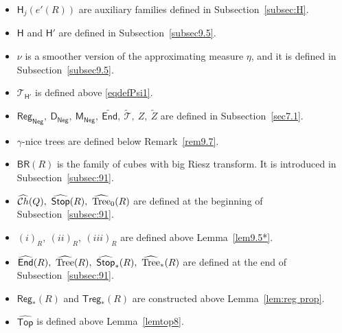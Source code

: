 \documentclass[11pt]{amsart}
\newcommand{\TT}{{\mathcal T}}
\newcommand{\Ch}{{\mathcal Ch}}
\newcommand{\vvv}{{\vspace{3mm}}}
\newcommand{\wt}[1]{{\widetilde{#1}}}
\newcommand{\wh}[1]{{\widehat{#1}}}
\newcommand{\ttt}{{\mathsf {Top}}}
\newcommand{\treg}{{\mathsf{Treg}}}
\newcommand{\tree}{{\rm Tree}}
\newcommand{\BR}{{\mathsf {BR}}}
\newcommand{\Stop}{{\mathsf{Stop}}}
\newcommand{\sD}{{\mathsf{D}}}
\newcommand{\sH}{{\mathsf{H}}}
\newcommand{\sM}{{\mathsf{M}}}
\newcommand{\Neg}{{\mathsf{Neg}}}
\newcommand{\End}{{\mathsf{End}}}
\newcommand{\Reg}{{\mathsf{Reg}}}
\theoremstyle{definition}
\theoremstyle{remark}
\numberwithin{equation}{section}
\begin{document}
\begin{itemize}
	\item $\sH_j(e'(R))$ are auxiliary families defined in Subsection~\ref{subsec:H}.
	\item $\sH$ and $\sH'$ are defined in Subsection~\ref{subsec9.5}.
	\item $\nu$ is a smoother version of the approximating measure $\eta$, and it is defined in Subsection~\ref{subsec9.5}.
	\item $\TT_{\sH'}$ is defined above \eqref{eqdefPsi1}.
	\item $\Reg_{\Neg},\ \sD_\Neg,\ \sM_\Neg,\ \wt\End,\ \wt\TT,\ Z,\ \wt Z$ are defined in Subsection~\ref{sec7.1}.
	\item $\gamma$-nice trees are defined below Remark~\ref{rem9.7}.
	\item $\BR(R)$ is the family of cubes with big Riesz transform. It is introduced in Subsection~\ref{subsec:91}.
	\item $\wh\Ch(Q),\ \wh\Stop(R),\ \wh\tree_0(R)$ are defined at the beginning of Subsection~\ref{subsec:91}.
	\item $(i)_R,\ (ii)_R,\ (iii)_R$ are defined above Lemma~\ref{lem9.5*}.
	\item $\wh\End(R),\ \wh\tree(R),\ \wh\Stop_*(R),\ \wh\tree_*(R)$ are defined at the end of Subsection~\ref{subsec:91}.
	\item $\Reg_*(R)$ and $\treg_*(R)$ are constructed above Lemma~\ref{lem:reg prop}. 
	\item $\wh\ttt$ is defined above Lemma~\ref{lemtop8}.
\end{itemize}

\vvv
\end{document}
